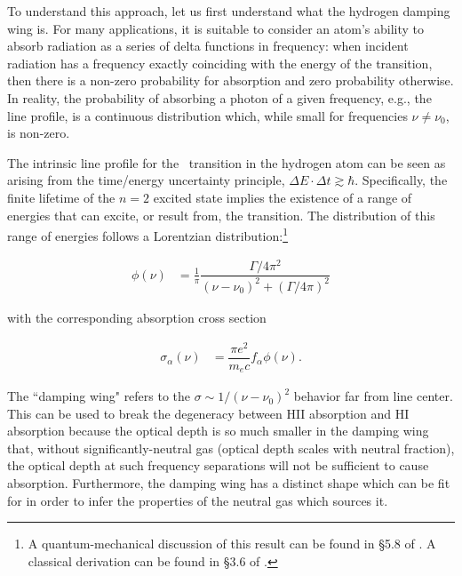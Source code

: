 To understand this approach, let us first understand what the hydrogen damping wing is. For many applications, it is suitable to consider an atom's ability to absorb radiation as a series of delta functions in frequency: when incident radiation has a frequency exactly coinciding with the energy of the transition, then there is a non-zero probability for absorption and zero probability otherwise. In reality, the probability of absorbing a photon of a given frequency, e.g., the line profile, is a continuous distribution which, while small for frequencies $\nu \neq \nu_{0}$, is non-zero. 


The intrinsic line profile for the \lya\ transition in the hydrogen atom can be seen as arising from the time/energy uncertainty principle, $\Delta E \cdot \Delta t \gtrsim \hbar$. Specifically, the finite lifetime of the $n = 2$ excited state implies the existence of a range of energies that can excite, or result from, the transition. The distribution of this range of energies follows a Lorentzian distribution:\footnote{A quantum-mechanical discussion of this result can be found in \S 5.8 of \cite{sakurai2011modern}. A classical derivation can be found in \S 3.6 of \cite{rybicki1979radiative}.}

\begin{align}
\phi(\nu) &= \frac{1}{\pi} \dfrac{\Gamma/4\pi^{2}}{(\nu - \nu_{0})^{2} + (\Gamma/4\pi)^2}
\end{align}

with the corresponding absorption cross section

\begin{align}
\sigma_{\alpha}(\nu) &= \dfrac{\pi e^2}{m_{e}c} f_{\alpha} \phi(\nu). \label{eq:IntroLineProfile}
\end{align}

The ``damping wing" refers to the $\sigma \sim 1/(\nu-\nu_{0})^{2}$ behavior far from line center. This can be used to break the degeneracy between HII absorption and HI absorption because the optical depth is so much smaller in the damping wing that, without significantly-neutral gas (optical depth scales with neutral fraction), the optical depth at such frequency separations will not be sufficient to cause absorption. Furthermore, the damping wing has a distinct shape which can be fit for in order to infer the properties of the neutral gas which sources it. 


